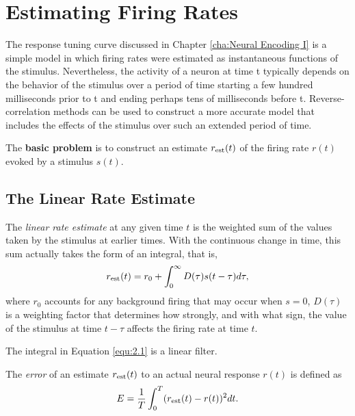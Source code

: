 \section{Estimating Firing Rates}
\label{sec:EstimatingFiringRates}

\begin{rem}
  The response tuning curve discussed in Chapter \ref{cha:Neural Encoding I} is a simple model in which firing rates were estimated as instantaneous functions of the stimulus. Nevertheless, the activity of a neuron at time t typically depends on the behavior of the stimulus over a period of time starting a few hundred milliseconds prior to t and ending perhaps tens of milliseconds before t. Reverse-correlation methods can be used to construct a more accurate model that includes the effects of the stimulus over such an extended period of time.
\end{rem}

\begin{rem}
  The \textbf{basic problem} is to construct an estimate $r_{\rm{est}}(t)$ of the firing rate $r(t)$ evoked by a stimulus $s(t)$.
\end{rem}

\subsection{The Linear Rate Estimate}

\begin{defn}
  \label{def:linearEstimate}
  The \emph{linear rate estimate} at any given time $t$ is the weighted sum of the values taken by the stimulus at earlier times. With the continuous change in time, this sum actually takes the form of an integral, that is,
  \begin{equation}
    \label{equ:2.1}
    r_{\rm{est}}(t) = r_0 + \int_0^{\infty}D(\tau) s(t-\tau)d\tau,
  \end{equation}
  where $r_0$ accounts for any background firing that may occur when $s = 0$, $D(\tau)$ is a weighting factor that determines how strongly,  and with what sign, the value of the stimulus at time $t-\tau$ affects the firing rate at time $t$.
\end{defn}

\begin{rem}
  The integral in Equation \ref{equ:2.1} is a linear filter.
\end{rem}

\begin{defn}
  \label{def:error}
  The \emph{error} of an estimate $r_{\rm{est}}(t)$ to an actual neural response $r(t)$ is defined as
  \begin{equation}
    \label{equ:2.3}
    E = \frac{1}{T}\int_0^T(r_{\rm{est}}(t)-r(t))^2dt.
  \end{equation}
\end{defn}


